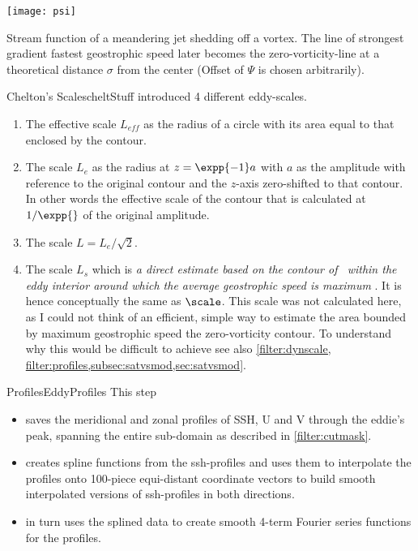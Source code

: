 \begin{marginfigure}
	\texttt{[image: psi]}
	\caption{Stream function of a meandering jet shedding off a vortex. The line of strongest gradient \ie fastest geostrophic speed later becomes the zero-vorticity-line at a theoretical distance $\sigma$ from the center (Offset of $\Psi$ is chosen arbitrarily).}
	\label{fig:psi}
\end{marginfigure}
\begin{filter}{Chelton's Scales}{cheltStuff}
\label{filter:chstuff}
\citet{Chelton2011} introduced 4 different eddy-scales.
\begin{enumerate}
	\item
	The effective scale $L_{eff}$ as the radius of a circle with its area equal to that enclosed by the contour.
	\item
	The scale $L_e$  as  the radius at $z = \expp{-1} a$ with $a$ as the amplitude with reference to the original contour and the $z$-axis zero-shifted to that contour. In other words the effective scale of the contour that is calculated at $1/\expp{}$ of the original amplitude.
	\item
	The scale $L=L_e/\sqrt{2}$.
	\item
	The scale $L_s$ which is \textit{a direct estimate based on the contour of \SSH~within the eddy interior around which the average geostrophic speed is maximum} \citep{Chelton2011}. It is hence conceptually the same as $\scale$. This scale was not calculated here, as I could not think of an efficient, simple way to estimate the area bounded by maximum geostrophic speed \ie the zero-vorticity contour. To understand why this would be difficult to achieve see also \cref{filter:dynscale, filter:profiles,subsec:satvsmod,sec:satvsmod}.
\end{enumerate}
\end{filter}
\begin{filter}{Profiles}{EddyProfiles}
\label{filter:profiles}
This step
\begin{itemize}
\item
 saves the meridional and zonal profiles of SSH, U and V through  the eddie's peak, spanning the entire sub-domain as described in \cref{filter:cutmask}.
\item
creates spline functions from the ssh-profiles and uses them to interpolate the profiles onto 100-piece equi-distant coordinate vectors to build smooth interpolated versions of ssh-profiles in both directions.
\item
in turn uses the splined data to create smooth 4-term Fourier series functions for the profiles.
\end{itemize}
\end{filter}
